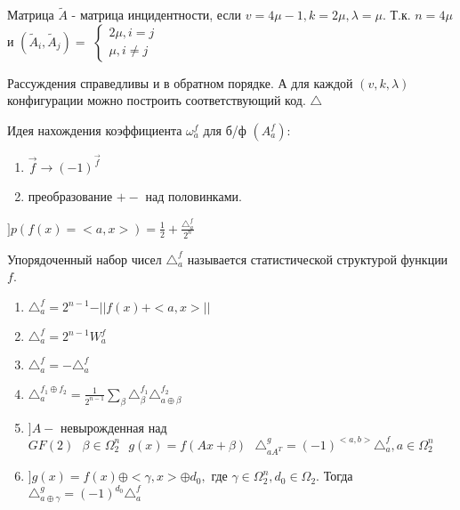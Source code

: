 Матрица $\tilde{A}$ - матрица инцидентности, если $v = 4\mu - 1, k = 2\mu, \lambda = \mu$.
Т.к. $n = 4\mu$ и $(\tilde{A}_i, \tilde{A}_j) = $
$\begin{cases}
	2\mu, i = j \\
	\mu, i\neq j
\end{cases}$

Рассуждения справедливы и в обратном порядке. А для каждой $(v, k, \lambda)$ конфигурации
можно построить соответствующий код. $\triangle $

Идея нахождения коэффициента $\omega_a^f$ для б/ф $(A_a^f)$:
\begin{enumerate}
	\item $\overrightarrow{f} \rightarrow (-1)^{\overrightarrow{f}}$
	\item преобразование $+-$ над половинками.
\end{enumerate}

$] p(f(x) = <a, x>) = \frac{1}{2} + \frac{\triangle_a^f}{2^n}$

\opr
Упорядоченный набор чисел $\triangle_a^f$ называется статистической структурой функции $f$.

\utv
\begin{enumerate}
	\item $\triangle_a^f = 2^{n - 1} - \vert\vert f(x) + <a, x> \vert\vert$
	\item $\triangle_a^f = 2^{n - 1} W_a^f$
	\item $\triangle_a^f = -\triangle_a^f$
	\item $\triangle_a^{f_1 \oplus f_2} = \frac{1}{2^{n - 1}} \sum_{\beta}\triangle_{\beta}^{f_1}\triangle_{a \oplus \beta}^{f_2}$
	\item $] A -$ невырожденная над $GF(2) \text{ } \beta \in \Omega_2^n \text{ } g(x) = f(Ax + \beta) \text{ } \triangle_{aA^T}^g = (-1)^{<a,b>}\triangle_a^f, a \in \Omega_2^n$
	\item $] g(x) = f(x) \oplus <\gamma, x> \oplus d_0, $ где $\gamma \in \Omega_2^n, d_0 \in \Omega_2$.
	Тогда $\triangle_{a\oplus\gamma}^g = (-1)^{d_0}\triangle_a^f$
\end{enumerate}